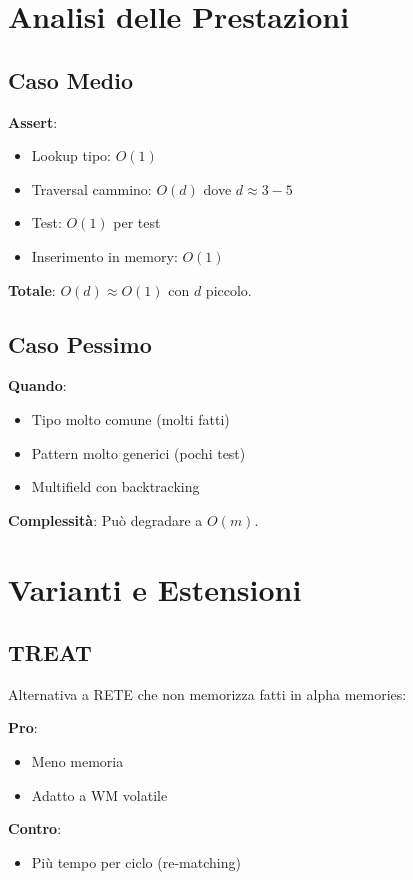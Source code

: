 \section{Analisi delle Prestazioni}

\subsection{Caso Medio}

\textbf{Assert}:
\begin{itemize}
\item Lookup tipo: $O(1)$
\item Traversal cammino: $O(d)$ dove $d \approx 3-5$
\item Test: $O(1)$ per test
\item Inserimento in memory: $O(1)$
\end{itemize}

\textbf{Totale}: $O(d) \approx O(1)$ con $d$ piccolo.

\subsection{Caso Pessimo}

\textbf{Quando}:
\begin{itemize}
\item Tipo molto comune (molti fatti)
\item Pattern molto generici (pochi test)
\item Multifield con backtracking
\end{itemize}

\textbf{Complessità}: Può degradare a $O(m)$.

\section{Varianti e Estensioni}

\subsection{TREAT}

Alternativa a RETE che non memorizza fatti in alpha memories:

\textbf{Pro}:
\begin{itemize}
\item Meno memoria
\item Adatto a WM volatile
\end{itemize}

\textbf{Contro}:
\begin{itemize}
\item Più tempo per ciclo (re-matching)
\end{itemize}

